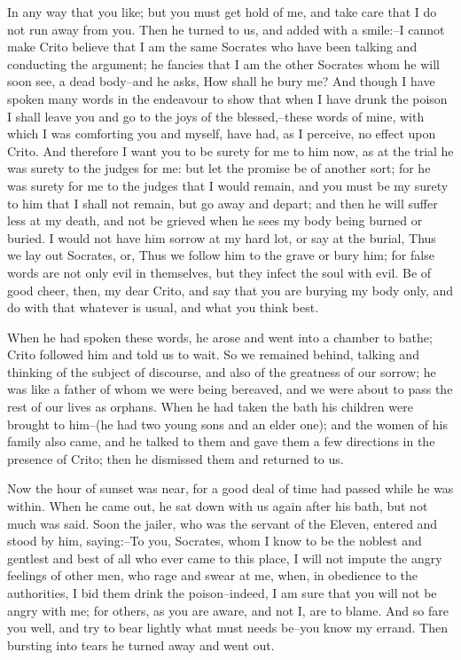 In any way that you like; but you must get hold of me, and take care
that I do not run away from you. Then he turned to us, and added with a
smile:--I cannot make Crito believe that I am the same Socrates who have
been talking and conducting the argument; he fancies that I am the other
Socrates whom he will soon see, a dead body--and he asks, How shall he
bury me? And though I have spoken many words in the endeavour to show
that when I have drunk the poison I shall leave you and go to the joys
of the blessed,--these words of mine, with which I was comforting you
and myself, have had, as I perceive, no effect upon Crito. And therefore
I want you to be surety for me to him now, as at the trial he was surety
to the judges for me: but let the promise be of another sort; for he
was surety for me to the judges that I would remain, and you must be my
surety to him that I shall not remain, but go away and depart; and then
he will suffer less at my death, and not be grieved when he sees my body
being burned or buried. I would not have him sorrow at my hard lot, or
say at the burial, Thus we lay out Socrates, or, Thus we follow him to
the grave or bury him; for false words are not only evil in themselves,
but they infect the soul with evil. Be of good cheer, then, my dear
Crito, and say that you are burying my body only, and do with that
whatever is usual, and what you think best.

When he had spoken these words, he arose and went into a chamber to
bathe; Crito followed him and told us to wait. So we remained behind,
talking and thinking of the subject of discourse, and also of the
greatness of our sorrow; he was like a father of whom we were being
bereaved, and we were about to pass the rest of our lives as orphans.
When he had taken the bath his children were brought to him--(he had two
young sons and an elder one); and the women of his family also came,
and he talked to them and gave them a few directions in the presence of
Crito; then he dismissed them and returned to us.

Now the hour of sunset was near, for a good deal of time had passed
while he was within. When he came out, he sat down with us again after
his bath, but not much was said. Soon the jailer, who was the servant of
the Eleven, entered and stood by him, saying:--To you, Socrates, whom
I know to be the noblest and gentlest and best of all who ever came to
this place, I will not impute the angry feelings of other men, who rage
and swear at me, when, in obedience to the authorities, I bid them drink
the poison--indeed, I am sure that you will not be angry with me; for
others, as you are aware, and not I, are to blame. And so fare you well,
and try to bear lightly what must needs be--you know my errand. Then
bursting into tears he turned away and went out.

